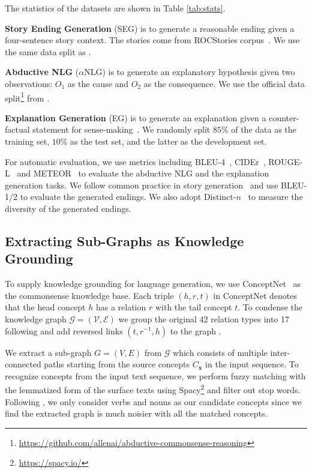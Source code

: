 \documentclass[11pt,a4paper]{article}
\begin{document}
The statistics of the datasets are shown in Table \ref{tab:stats}.

\noindent\textbf{Story Ending Generation} (SEG) is to generate a reasonable ending given a four-sentence story context. The stories come from ROCStories corpus~\citep{Mostafazadeh2016ACA}. We use the same data split as \citet{Guan2019StoryEG}.

\noindent\textbf{Abductive NLG} ($\alpha$NLG) is to generate an explanatory hypothesis given two observations: $O_1$ as the cause and $O_2$ as the consequence. We use the official data split\footnote{\url{https://github.com/allenai/abductive-commonsense-reasoning}} from \citet{Bhagavatula2019AbductiveCR}.

\noindent\textbf{Explanation Generation} (EG) is to generate an explanation given a counter-factual statement for sense-making~\citep{Wang2019DoesIM}. We randomly split $85\%$ of the data as the training set, $10\%$ as the test set, and the latter as the development set.


For automatic evaluation, we use metrics including BLEU-4~\citep{Papineni2001BleuAM}, CIDEr~\citep{Vedantam2015CIDErCI}, ROUGE-L~\citep{Lin2004ROUGEAP} and METEOR~\citep{Banerjee2005METEORAA} to evaluate the abductive NLG and the explanation generation tasks. We follow common practice in story generation~\citep{Guan2019StoryEG,guan2020knowledge} and use BLEU-1/2 to evaluate the generated endings. We also adopt Distinct-$n$~\citep{Li2016ADO} to measure the diversity of the generated endings.

\subsection{Extracting Sub-Graphs as Knowledge Grounding}\label{sec:subgraph}

To supply knowledge grounding for language generation, we use ConceptNet~\citep{Speer2012RepresentingGR} as the commonsense knowledge base. Each triple $(h, r, t)$ in ConceptNet denotes that the head concept $h$ has a relation $r$ with the tail concept $t$. To condense the knowledge graph $\mathcal{G}=(\mathcal{V}, \mathcal{E})$ we group the original 42 relation types into 17 following \citet{lin-etal-2019-kagnet} and add reversed links $(t, r^{-1}, h)$ to the graph \citep{Lin2018MultiHopKG, Das2018GoFA}.

We extract a sub-graph $G=(V, E)$ from $\mathcal{G}$ which consists of multiple inter-connected paths starting from the source concepts $C_{\bm{x}}$ in the input sequence. To recognize concepts from the input text sequence, we perform fuzzy matching with the lemmatized form of the surface texts using Spacy\footnote{\url{https://spacy.io/}} and filter out stop words. Following \citet{Guan2019StoryEG}, we only consider verbs and nouns as our candidate concepts since we find the extracted graph is much noisier with all the matched concepts.
\end{document}
